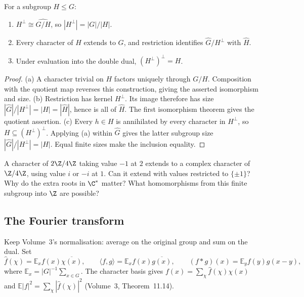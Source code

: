 \begin{proposition}\label{prop:annihilator}
For a subgroup $H\le G$:
\begin{enumerate}
\item[(a)] $H^\perp\cong\widehat{G/H}$, so $|H^\perp|=|G|/|H|$.
\item[(b)] Every character of $H$ extends to $G$, and restriction identifies $\widehat G/H^\perp$ with $\widehat H$.
\item[(c)] Under evaluation into the double dual, $(H^\perp)^\perp=H$.
\end{enumerate}
\end{proposition}
\begin{proof}
(a) A character trivial on $H$ factors uniquely through $G/H$. Composition with the quotient map reverses this construction, giving the asserted isomorphism and size.
(b) Restriction has kernel $H^\perp$. Its image therefore has size $|\widehat G|/|H^\perp|=|H|=|\widehat H|$, hence is all of $\widehat H$. The first isomorphism theorem gives the quotient assertion.
(c) Every $h\in H$ is annihilated by every character in $H^\perp$, so $H\subseteq(H^\perp)^\perp$. Applying (a) within $\widehat G$ gives the latter subgroup size $|\widehat G|/|H^\perp|=|H|$. Equal finite sizes make the inclusion equality.
\end{proof}

\begin{think}
A character of $2\Z/4\Z$ taking value $-1$ at $2$ extends to a complex character of $\Z/4\Z$, using value $i$ or $-i$ at $1$. Can it extend with values restricted to $\{\pm1\}$? Why do the extra roots in $\C^*$ matter? What homomorphisms from this finite subgroup into $\Z$ are possible?
\end{think}

\subsection*{The Fourier transform}

Keep Volume~3's normalisation: average on the original group and sum on the dual. Set
\[
\hat f(\chi)=\mathbb E_x f(x)\overline{\chi(x)},\qquad
\langle f,g\rangle=\mathbb E_x f(x)\overline{g(x)},\qquad
(f*g)(x)=\mathbb E_yf(y)g(x-y),
\]
where $\mathbb E_x=|G|^{-1}\sum_{x\in G}$. The character basis gives $f(x)=\sum_\chi\hat f(\chi)\chi(x)$ and $\mathbb E|f|^2=\sum_\chi|\hat f(\chi)|^2$ (Volume~3, Theorem~11.14).

